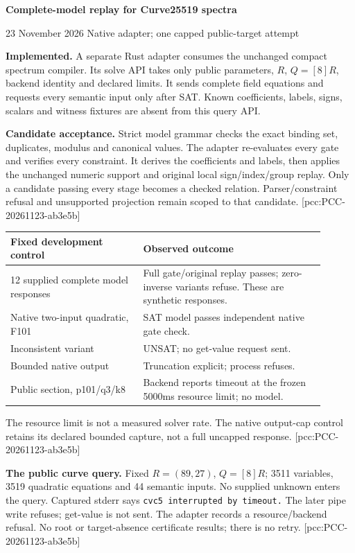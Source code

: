 \documentclass[10pt]{article}
\begin{document}
{\Large\bfseries\color{ink} Complete-model replay for Curve25519 spectra}\par
{\small 23 November 2026 \quad Native adapter; one capped public-target attempt}

\textbf{Implemented.} A separate Rust adapter consumes the unchanged compact
spectrum compiler. Its solve API takes only public parameters, $R$, $Q=[8]R$,
backend identity and declared limits. It sends complete field equations and
requests every semantic input only after SAT. Known coefficients, labels,
signs, scalars and witness fixtures are absent from this query API.

\textbf{Candidate acceptance.} Strict model grammar checks the exact binding
set, duplicates, modulus and canonical values. The adapter re-evaluates every
gate and verifies every constraint. It derives the coefficients and labels,
then applies the unchanged numeric support and original local sign/index/group
replay. Only a candidate passing every stage becomes a checked relation.
Parser/constraint refusal and unsupported projection remain scoped to that
candidate. [pcc:PCC-20261123-ab3e5b]

\begin{center}
\begin{tabular}{p{0.38\linewidth}p{0.52\linewidth}}
\toprule
Fixed development control & Observed outcome\\
\midrule
12 supplied complete model responses & Full gate/original replay passes; zero-inverse variants refuse. These are synthetic responses.\\
Native two-input quadratic, F101 & SAT model passes independent native gate check.\\
Inconsistent variant & UNSAT; no get-value request sent.\\
Bounded native output & Truncation explicit; process refuses.\\
Public section, p101/q3/k8 & Backend reports timeout at the frozen 5000ms resource limit; no model.\\
\bottomrule
\end{tabular}
\end{center}
The resource limit is not a measured solver rate. The native output-cap
control retains its declared bounded capture, not a full uncapped response.
[pcc:PCC-20261123-ab3e5b]

\textbf{The public curve query.} Fixed $R=(89,27)$, $Q=[8]R$; 3511 variables,
3519 quadratic equations and 44 semantic inputs. No supplied unknown enters
the query. Captured stderr says \texttt{cvc5 interrupted by timeout.}
The later pipe write refuses; get-value is not sent. The adapter records a
resource/backend refusal. No root or target-absence certificate results;
there is no retry. [pcc:PCC-20261123-ab3e5b]
\end{document}
